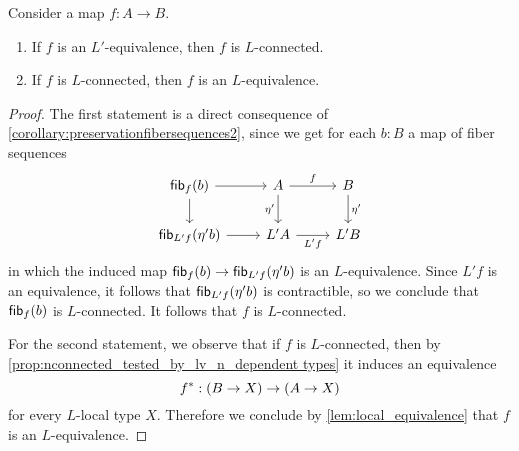\begin{prp}\label{cor:L'equivalenceisLconnected}
Consider a map $f:A\to B$.
\begin{enumerate}
\item If $f$ is an $L'$-equivalence, then $f$ is $L$-connected.
\item If $f$ is $L$-connected, then $f$ is an $L$-equivalence.
\end{enumerate}
\end{prp}

\begin{proof}
The first statement is a direct consequence of \cref{corollary:preservationfibersequences2}, since we get for each $b:B$ a map of fiber sequences
\begin{equation*}
\begin{tikzcd}
\fib{f}{b} \arrow[r] \arrow[d] & A \arrow[r,"f"] \arrow[d,swap,"\eta'"] & B \arrow[d,"\eta'"] \\
\fib{L'f}{\eta'b} \arrow[r] & L'A \arrow[r,swap,"L'f"] & L'B
\end{tikzcd}
\end{equation*}
in which the induced map $\mathsf{fib}_{f}(b)\to\mathsf{fib}_{L'f}(\eta'b)$ is an $L$-equivalence. Since $L'f$ is an equivalence, it follows that $\mathsf{fib}_{L'f}(\eta'b)$ is contractible, so we conclude that $\mathsf{fib}_{f}(b)$ is $L$-connected. It follows that $f$ is $L$-connected.

For the second statement, we observe that if $f$ is $L$-connected, then by \cref{prop:nconnected_tested_by_lv_n_dependent types} it induces an equivalence
\begin{equation*}
{f}^\ast : (B\to X)\to (A\to X)
\end{equation*}
for every $L$-local type $X$. Therefore we conclude by \cref{lem:local_equivalence} that $f$ is an $L$-equivalence.
\end{proof}


